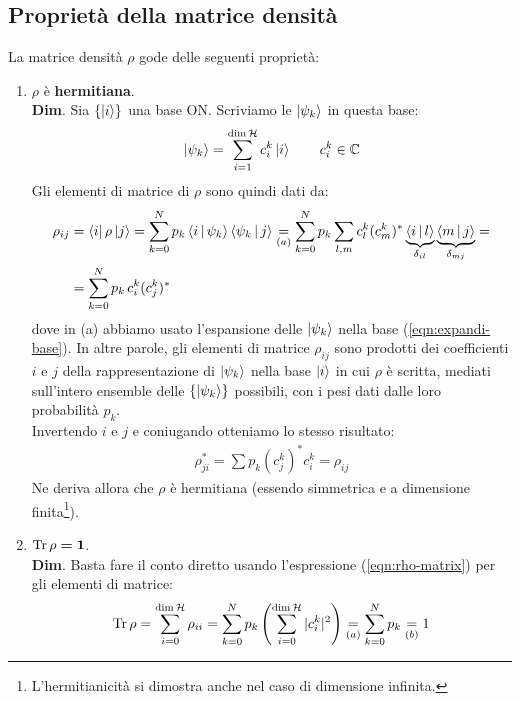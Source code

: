 \documentclass[../../InformazioneQuantistica.tex]{subfiles}
\begin{document}
\subsection{Proprietà della matrice densità}
La matrice densità $\rho$ gode delle seguenti proprietà:
\begin{enumerate}
\item $\rho$ è \textbf{hermitiana}.\\
\textbf{Dim}. Sia $\{\Ket{i}\}$ una base ON. Scriviamo le $\Ket{\psi_k}$ in questa base:
\begin{align}
\Ket{\psi_k} = \sum_{i=1}^{\operatorname{dim}\mathcal{H}} c_i^k \Ket{i} \qquad c_i^k \in \mathbb{C}
\label{eqn:expandi-base}
\end{align} 
Gli elementi di matrice di $\rho$ sono quindi dati da:
\begin{align}\nonumber
\rho_{ij} &= \Bra{i}\rho\Ket{j} = \sum_{k=0}^N
p_k \Braket{i|\psi_k}\Braket{\psi_k|j} \underset{(a)}{=} \sum_{k=0}^N p_k \sum_{l,m} c^k_l (c_m^k)^* \underbrace{\Braket{i|l}}_{\delta_{il}}\underbrace{\Braket{m|j}}_{\delta_{mj}} =\\
&=\sum_{k=0}^N p_k\, c_i^k (c_j^k)^*
\label{eqn:rho-matrix} 
\end{align}
dove in (a) abbiamo usato l'espansione delle $\Ket{\psi_k}$ nella base (\ref{eqn:expandi-base}). In altre parole, gli elementi di matrice $\rho_{ij}$ sono prodotti dei coefficienti $i$ e $j$ della rappresentazione di $\Ket{\psi_k}$ nella base $\Ket{i}$ in cui $\rho$ è scritta, mediati sull'intero ensemble delle $\{\Ket{\psi_k}\}$ possibili, con i pesi dati dalle loro probabilità $p_k$. \\
Invertendo $i$ e $j$ e coniugando otteniamo lo stesso risultato:
\begin{align*}
\rho_{ji}^* = \sum p_k (c_j^k)^* c_i^k = \rho_{ij}
\end{align*}
Ne deriva allora che $\rho$ è hermitiana (essendo simmetrica e a dimensione finita\footnote{L'hermitianicità si dimostra anche nel caso di dimensione infinita.}).
\item $\operatorname{Tr}\rho \bm{= 1}$.\\
\textbf{Dim}. Basta fare il conto diretto usando l'espressione (\ref{eqn:rho-matrix}) per gli elementi di matrice:
\begin{align*}
\operatorname{Tr}\rho = \sum_{i=0}^{\operatorname{dim}\mathcal{H}} \rho_{ii} = \sum_{k=0}^N p_k \left(\sum_{i=0}^{\operatorname{dim} \mathcal{H}} |c_i^k|^2 \right) \underset{(a)}{=} \sum_{k=0}^N p_k \underset{(b)}{=} 1
\end{align*}

\end{enumerate}
\end{document}
